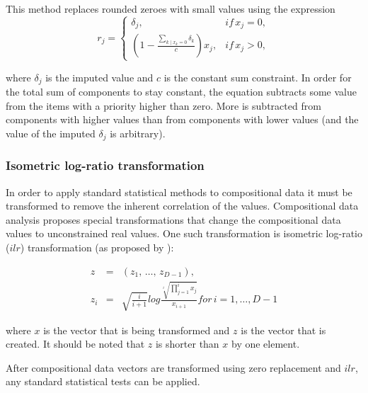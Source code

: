 This method replaces rounded zeroes with small values using the expression
\begin{equation}
r_{j}=\begin{cases}
\delta_{j}, & if\, x_{j}=0,\\
(1-\frac{\sum_{k\mid x_{k}=0}\delta_{k}}{c})x_{j}, & if\, x_{j}>0,\end{cases}\label{eq:zero-replace}
\end{equation}

where $\delta_{j}$ is the imputed value and $c$ is the constant sum constraint.
In order for the total sum of components to stay constant, the equation subtracts 
some value from the items with a priority higher than zero.
More is subtracted from components with higher values than from components with lower 
values (and the value of the imputed $\delta_{j}$ is arbitrary).

\subsubsection{\label{Isometric-Logratio-Transformation}Isometric log-ratio transformation}
In order to apply standard statistical methods to compositional data it must be transformed to remove the inherent correlation of the values.
Compositional data analysis proposes special transformations that change the compositional data values to unconstrained real values.
One such transformation is isometric log-ratio ($ilr$) transformation (as proposed by \citep{Pawlowsky-Glahn2006,Filzmoser2007a}):

\begin{eqnarray}
z & = & \left(z_{1},\,\ldots,\, z_{D-1}\right),\nonumber \\
z_{i} & = & \sqrt{\frac{i}{i+1}}log\frac{\sqrt[i]{\prod_{j=1}^{i}x_{j}}}{x_{i+1}}for\, i=1,\ldots,D-1\label{eq:ilr}
\end{eqnarray}

where $x$ is the vector that is being transformed and $z$ is the vector that is created. It should be noted that $z$ is shorter than $x$ by one element.

After compositional data vectors are transformed using zero replacement and $ilr$, any standard statistical tests can be applied.